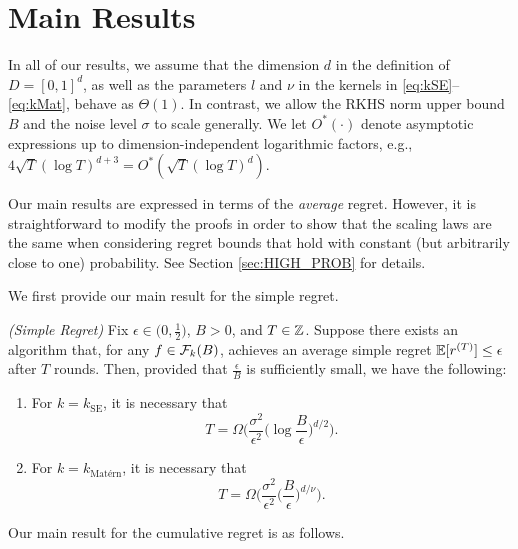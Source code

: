 \documentclass[english,onecolumn,final,11pt]{IEEEtran} %
\newcommand{\kSE}{k_{\text{SE}}}
\newcommand{\kMat}{k_{\text{Mat\'ern}}}
\begin{document}
\section{Main Results} \label{sec:results}

In all of our results, we assume that the dimension $d$ in the definition of $D = [0,1]^d$, as well as the parameters $l$ and $\nu$ in the kernels in \eqref{eq:kSE}--\eqref{eq:kMat}, behave as $\Theta(1)$.  In contrast, we allow the RKHS norm upper bound $B$ and the noise level $\sigma$ to scale generally.  We let $O^*(\cdot)$ denote asymptotic expressions up to dimension-independent logarithmic factors, e.g., $4\sqrt{T}(\log T)^{d+3} = O^*(\sqrt{T}(\log T)^d)$.

Our main results are expressed in terms of the \emph{average} regret.  However, it is straightforward to modify the proofs in order to show that the scaling laws are the same when considering regret bounds that hold with constant (but arbitrarily close to one) probability.  See Section \ref{sec:HIGH_PROB} for details.

We first provide our main result for the simple regret.

\begin{theorem} \label{thm:instantaneous}
    \emph{(Simple Regret)}
    Fix $\epsilon \in \big(0,\frac{1}{2}\big)$, $B > 0$, and $T \in \mathbb{Z}$.   Suppose there exists an algorithm that, for any $f \in \mathcal{F}_k(B)$, achieves an average simple regret $\mathbb{E}[r^{(T)}] \le \epsilon$ after $T$ rounds.  Then, provided that $\frac{\epsilon}{B}$ is sufficiently small, we have the following:
    \begin{enumerate}
        \item For \emph{$k = \kSE$}, it is necessary that
        \begin{equation}
            T = \Omega\bigg( \frac{\sigma^2}{\epsilon^2} \Big(\log\frac{B}{\epsilon}\Big)^{d/2} \bigg). \label{eq:inst_se}
       \end{equation}
        \item For \emph{$k = \kMat$}, it is necessary that
        \begin{equation}
            T = \Omega\bigg( \frac{\sigma^2}{\epsilon^2} \Big(\frac{B}{\epsilon}\Big)^{d/\nu} \bigg). \label{eq:inst_Mat}
       \end{equation}
    \end{enumerate}
\end{theorem}

Our main result for the cumulative regret is as follows.
\end{document}
